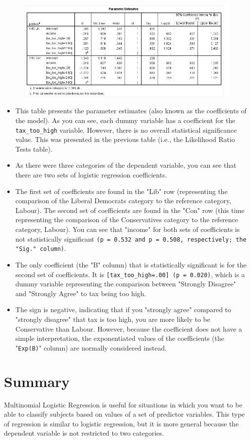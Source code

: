 \documentclass[a4paper,12pt]{article}
\begin{document}
\begin{figure}[h!]
	\centering
	\includegraphics[width=0.7\linewidth]{multinomial}

\end{figure}
\begin{itemize}
	\item This table presents the parameter estimates (also known as the coefficients of the model). As you can see, each dummy variable has a coefficient for the \texttt{tax\_too\_high} variable. However, there is no overall statistical significance value. This was presented in the previous table (i.e., the Likelihood Ratio Tests table). 
	\item As there were three categories of the dependent variable, you can see that there are two sets of logistic regression coefficients. 
	\item The first set of coefficients are found in the "Lib" row (representing the comparison of the Liberal Democrats category to the reference category, Labour). The second set of coefficients are found in the "Con" row (this time representing the comparison of the Conservatives category to the reference category, Labour). You can see that "income" for both sets of coefficients is not statistically significant \texttt{(p = 0.532 and p = 0.508, respectively; the "Sig." column)}.
	
	\item The only coefficient (the "B" column) that is statistically significant is for the second set of coefficients. It is \texttt{[tax\_too\_high=.00] (p = 0.020)}, which is a dummy variable representing the comparison between "Strongly Disagree" and "Strongly Agree" to tax being too high. 
	\item The sign is negative, indicating that if you "strongly agree" compared to "strongly disagree" that tax is too high, you are more likely to be Conservative than Labour. However, because the coefficient does not have a simple interpretation, the exponentiated values of the coefficients (the "\texttt{Exp(B)}" column) are normally considered instead.
\end{itemize}



\section*{Summary}

Multinomial Logistic Regression is useful for situations in which you want to be able to classify
subjects based on values of a set of predictor variables. This type of regression is similar to logistic
regression, but it is more general because the dependent variable is not restricted to two categories.
\end{document}

